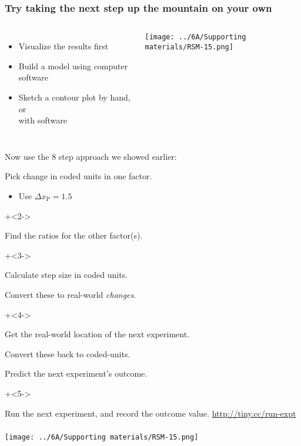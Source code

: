 \begin{frame}\frametitle{Try taking the next step up the mountain on your own}
	
	\begin{columns}[T]
		
			\begin{itemize}
				\item	Visualize the results first
				\item	Build a model using computer software
				\item	Sketch a contour plot by hand, or \\with software
			\end{itemize}
			\centerline{\texttt{[image: ../6A/Supporting materials/RSM-15.png]}}
	\end{columns}
	
	\pause
	\vspace{-2.5cm}
	{\color{myOrange}Now use the 8 step approach we showed earlier:}
	\vspace{0.2cm}
	\begin{enumerate}

			\item	Pick change in coded units in one factor. 
				\begin{itemize}
					\item	Use $\Delta x_\text{P}= 1.5$
				\end{itemize}
			\onslide+<2->{
				\item	Find the ratios for the other factor(s).
			}
			\onslide+<3->{
				\item	Calculate step size in coded units.
				\item	Convert these to real-world \emph{changes}.
			}
			\onslide+<4->{
				\item	Get the real-world location	of the next experiment.
				\item	Convert these back to coded-units.
				\item	Predict the next experiment's outcome.
			}
			\onslide+<5->{
				\item	Run the next experiment, and record the outcome value.  \href{http://tiny.cc/run-expt}{http://tiny.cc/run-expt}
			}
	\end{enumerate}
	
\end{frame}

\begin{frame}\frametitle{}
	\centerline{\texttt{[image: ../6A/Supporting materials/RSM-15.png]}}
\end{frame}


